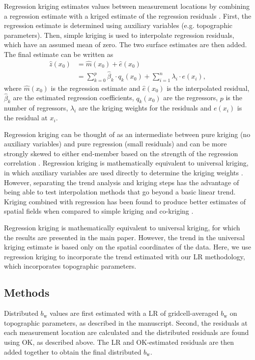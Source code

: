 \documentclass[onecolumn, letterpaper]{igs}
\begin{document}
Regression kriging estimates values between measurement locations by combining a regression estimate with a kriged estimate of the regression residuals \citep{Hengl2007}. First, the regression estimate is determined using auxiliary variables (e.g. topographic parameters). Then, simple kriging is used to interpolate regression residuals, which have an assumed mean of zero. The two surface estimates are then added. The final estimate can be written as 
\begin{align}
\hat{z}(x_0) &= \hat{m}(x_0) + \hat{e}(x_0)\\
& = \sum^p_{k=0}\hat{\beta}_k \cdot	q_k(x_0)+ \sum_{i=1}^{n} \lambda_i \cdot e(x_i),
\end{align}
where $\hat{m}(x_0)$ is the regression estimate and $\hat{e}(x_0)$ is the interpolated residual, $\hat{\beta}_k$ are the estimated regression coefficients, $q_k(x_0)$ are the regressors, $p$ is the number of regressors, $\lambda_i$ are the kriging weights for the residuals and $e(x_i)$ is the residual at $x_i$. 

Regression kriging can be thought of as an intermediate between pure kriging (no auxiliary variables) and pure regression (small residuals) and can be more strongly skewed to either end-member based on the strength of the regression correlation \citep{Hengl2007}. Regression kriging is mathematically equivalent to universal kriging, in which auxiliary variables are used directly to determine the kriging weights \citep{Hengl2007}. However, separating the trend analysis and kriging steps has the advantage of being able to test interpolation methods that go beyond a basic linear trend. Kriging combined with regression has been found to produce better estimates of spatial fields when compared to simple kriging and co-kriging \citep[e.g.][]{Knotters1995}.

Regression kriging is mathematically equivalent to universal kriging, for which the results are presented in the main paper. However, the trend in the universal kriging estimate is based only on the spatial coordinates of the data. Here, we use regression kriging to incorporate the trend estimated with our LR methodology, which incorporates topographic parameters. 

\subsection{Methods}

Distributed $b_\mathrm{w}$ values are first estimated with a LR of gridcell-averaged $b_\mathrm{w}$ on topographic parameters, as described in the manuscript. Second, the residuals at each measurement location are calculated and the distributed residuals are found using OK, as described above. The LR and OK-estimated residuals are then added together to obtain the final distributed $b_\mathrm{w}$. 
\end{document}
